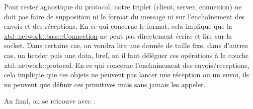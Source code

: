 Pour rester agnostique du protocol, notre triplet (client, server, connexion) ne doit pas faire de supposition ni le format du message ni sur l'enchaînement des envois et des réceptions. En ce qui concerne le format, cela implique que la \hyperlink{classxtd_1_1network_1_1base_1_1Connection}{xtd\-::network\-::base\-::\-Connection} ne peut pas directement écrire et lire sur la socket. Dans certains cas, on voudra lire une donnée de taille fixe, dans d'autres cas, un header puis une data, bref, on il faut déléguer ces opérations à la couche xtd\-::network\-::protocol. En ce qui concerne l'enchainement des envois/receptions, cela implique que ces objets ne peuvent pas lancer une réception ou un envoi, ils ne peuvent que définir ces primitives mais sans jamais les appeler.

Au final, on se retrouve avec \-:


